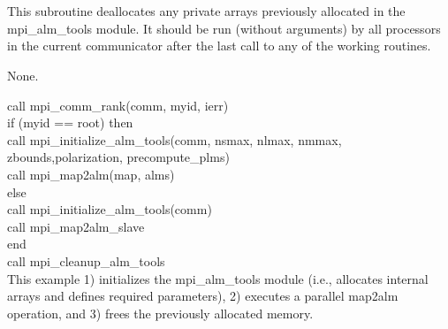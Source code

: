 
\sloppy


 \section[mpi\_cleanup\_alm\_tools]{ }
\label{sub:mpi_cleanup_alm_tools}
\author{Hans K. Eriksen}

\begin{facility}
{This subroutine deallocates any private arrays previously allocated
in the mpi\_alm\_tools module. It should be run (without arguments) by
all processors in the current communicator after the last call to any
of the working routines. 
}
{\modMpiAlmTools}
\end{facility}

\begin{f90format}
{}
\end{f90format}

\begin{arguments}
{
None.
}
\end{arguments}

\begin{example}
{
call mpi\_comm\_rank(comm, myid, ierr)\\
if (myid == root) then\\
\hspace*{1cm}call mpi\_initialize\_alm\_tools(comm, nsmax, nlmax, nmmax, \\
\hspace*{3cm}zbounds,polarization, precompute\_plms)\\
\hspace*{1cm}call mpi\_map2alm(map, alms)\\
else \\
\hspace*{1cm}call mpi\_initialize\_alm\_tools(comm)\\
\hspace*{1cm}call mpi\_map2alm\_slave\\
end\\
call mpi\_cleanup\_alm\_tools\\
}
{
This example 1) initializes the mpi\_alm\_tools module (i.e.,
allocates internal arrays and defines required parameters), 2)
executes a parallel map2alm operation, and 3) frees the previously
allocated memory.
}
\end{example}

